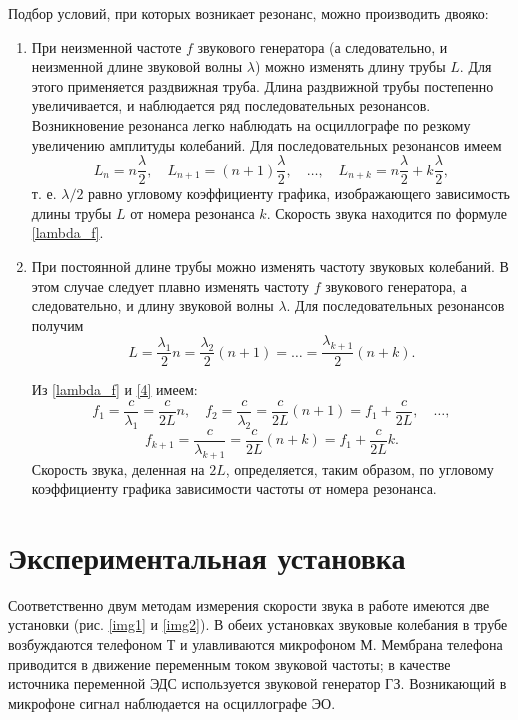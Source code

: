\documentclass[a4paper,12pt]{article} %
\begin{document}
Подбор условий, при которых возникает резонанс, можно производить двояко:
\begin{enumerate}
\item При неизменной частоте $ f $ звукового генератора (а следовательно, и неизменной длине звуковой волны $ \lambda $) можно изменять длину трубы $ L $. Для этого применяется раздвижная труба. Длина раздвижной трубы постепенно увеличивается, и наблюдается ряд последовательных резонансов. Возникновение резонанса легко наблюдать на осциллографе по резкому увеличению амплитуды колебаний. Для последовательных резонансов имеем
\begin{equation}\label{first}
L_n=n\frac{\lambda}{2}, \quad L_{n+1}=(n+1)\frac{\lambda}{2}, \quad \dots, \quad L_{n+k} = n\frac{\lambda}{2}+k\frac{\lambda}{2},
\end{equation} т. е. $ \lambda/2 $ равно угловому коэффициенту графика, изображающего зависимость длины трубы $ L $ от номера резонанса $ k $. Скорость звука находится по формуле \eqref{lambda_f}.
\item При постоянной длине трубы можно изменять частоту звуковых колебаний. В этом случае следует плавно изменять частоту $ f $ звукового генератора, а следовательно, и длину звуковой волны $ \lambda $. Для последовательных резонансов получим 
\begin{equation}\label{4}
L=\frac{\lambda_1}{2}n=\frac{\lambda_2}{2}(n+1)=\dots=\frac{\lambda_{k+1}}{2}(n+k).
\end{equation}

Из \eqref{lambda_f} и \eqref{4} имеем:
\[ f_1=\frac{c}{\lambda_1}=\frac{c}{2L}n, \quad f_2=\frac{c}{\lambda_2}=\frac{c}{2L}(n+1)=f_1+\frac{c}{2L},\quad \dots, \]
\begin{equation}\label{5}
f_{k+1}=\frac{c}{\lambda_{k+1}}=\frac{c}{2L}(n+k)=f_1+\frac{c}{2L}k.
\end{equation}
Скорость звука, деленная на $ 2L $, определяется, таким образом, по угловому коэффициенту графика зависимости частоты от номера резонанса.
\end{enumerate}

\section{Экспериментальная установка}

Соответственно двум методам измерения скорости звука в работе имеются две установки (рис. \ref{img1} и \ref{img2}). В обеих установках звуковые колебания в трубе возбуждаются телефоном Т и улавливаются микрофоном М. Мембрана телефона приводится в движение переменным током звуковой частоты; в качестве источника переменной ЭДС используется звуковой генератор ГЗ. Возникающий в микрофоне сигнал наблюдается на осциллографе ЭО.
\end{document}
